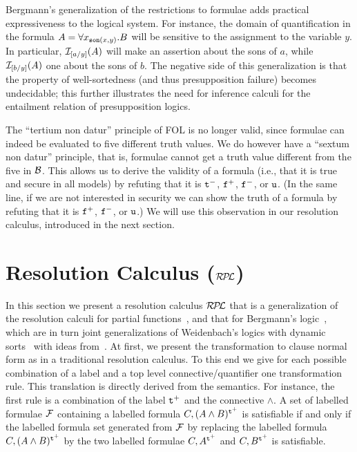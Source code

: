 \documentclass{\filespath jancl}
\newcommand{\undefined}{{\tt u}}
\newcommand{\twts}{{{\tt t}^+}}
\newcommand{\twfs}{{{\tt f}^+}}
\newcommand{\twti}{{{\tt t}^-}}
\newcommand{\twfi}{{{\tt f}^-}}
\def\presuppres{{\cal R\kern-.3ex P\kern-.4ex L}}
\begin{document}
\begin{remark}
  Bergmann's generalization of the restrictions to formulae adds practical
  expressiveness to the logical system. For instance, the domain of
  quantification in the formula $A=\forall x_{{\tt son}(x,y)}.B$  will be sensitive
  to the assignment to the variable $y$. In particular, ${\cal I}_{[a/y]}(A)$ will
  make an assertion about the sons of $a$, while ${\cal I}_{[b/y]}(A)$ one about the
  sons of $b$. The negative side of this generalization is that the property
  of well-sortedness (and thus presupposition failure) becomes undecidable;
  this further illustrates the need for inference calculi for the entailment
  relation of presupposition logics.
\end{remark}

\begin{remark}
  The ``tertium non datur'' principle of FOL is no longer valid, since formulae
  can indeed be evaluated to five different truth values.  We do however have a
  ``sextum non datur'' principle, that is, formulae cannot get a truth value
  different from the five in ${\cal B}$.  This allows us to derive the validity of a
  formula (i.e., that it is true and secure in all models) by refuting that it is
  $\twti$, $\twfs$, $\twfi$, or $\undefined$.  (In the same line, if we are not
  interested in security we can show the truth of a formula by refuting that it
  is $\twfs$, $\twfi$, or $\undefined$.)  We will use this observation in our
  resolution calculus, introduced in the next section.
\end{remark}

\section{Resolution Calculus ($\presuppres$)}\label{sec:presupplres} 

In this section we present a resolution calculus $\presuppres$ that is a generalization of
the resolution calculi for partial functions~\cite{KeKo94}, and that for Bergmann's
logic~\cite{KeKo:arcfp96}, which are in turn joint generalizations of Weidenbach's logics
with dynamic sorts~\cite{Weidenbach91} with ideas from~\cite{BaFe92,Haehnle:adimvl94}. At
first, we present the transformation to clause normal form as in a traditional resolution
calculus. To this end we give for each possible combination of a label and a top level
connective/quantifier one transformation rule. This translation is directly derived from
the semantics. For instance, the first rule is a combination of the label $\twts$ and the
connective $\land$. A set of labelled formulae ${\cal F}$ containing a labelled formula
$C,(A\land B)^\twts$ is satisfiable if and only if the labelled formula set generated from
${\cal F}$ by replacing the labelled formula $C,(A\land B)^\twts$ by the two labelled formulae
$C,A^\twts$ and $C,B^\twts$ is satisfiable.
\end{document}
